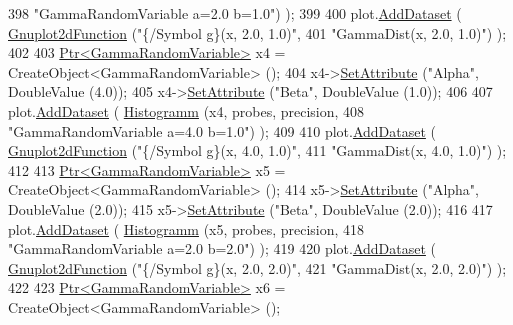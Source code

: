 \begin{DoxyCode}
398                                   \textcolor{stringliteral}{"GammaRandomVariable a=2.0 b=1.0"}) );
399 
400     plot.\hyperlink{classns3_1_1Gnuplot_a306ec724a327cf9ab699700f31fca0a1}{AddDataset} ( \hyperlink{classns3_1_1Gnuplot2dFunction}{Gnuplot2dFunction} (\textcolor{stringliteral}{"\{/Symbol g\}(x, 2.0, 1.0)"},
401                                          \textcolor{stringliteral}{"GammaDist(x, 2.0, 1.0)"}) );
402 
403     \hyperlink{classns3_1_1Ptr}{Ptr<GammaRandomVariable>} x4 = CreateObject<GammaRandomVariable> ();
404     x4->\hyperlink{classns3_1_1ObjectBase_ac60245d3ea4123bbc9b1d391f1f6592f}{SetAttribute} (\textcolor{stringliteral}{"Alpha"}, DoubleValue (4.0));
405     x4->\hyperlink{classns3_1_1ObjectBase_ac60245d3ea4123bbc9b1d391f1f6592f}{SetAttribute} (\textcolor{stringliteral}{"Beta"}, DoubleValue (1.0));
406 
407     plot.\hyperlink{classns3_1_1Gnuplot_a306ec724a327cf9ab699700f31fca0a1}{AddDataset} ( \hyperlink{main-random-variable-stream_8cc_a2cfd3837ab3f2e816cf53486d7a186b5}{Histogramm} (x4, probes, precision,
408                                   \textcolor{stringliteral}{"GammaRandomVariable a=4.0 b=1.0"}) );
409 
410     plot.\hyperlink{classns3_1_1Gnuplot_a306ec724a327cf9ab699700f31fca0a1}{AddDataset} ( \hyperlink{classns3_1_1Gnuplot2dFunction}{Gnuplot2dFunction} (\textcolor{stringliteral}{"\{/Symbol g\}(x, 4.0, 1.0)"},
411                                          \textcolor{stringliteral}{"GammaDist(x, 4.0, 1.0)"}) );
412 
413     \hyperlink{classns3_1_1Ptr}{Ptr<GammaRandomVariable>} x5 = CreateObject<GammaRandomVariable> ();
414     x5->\hyperlink{classns3_1_1ObjectBase_ac60245d3ea4123bbc9b1d391f1f6592f}{SetAttribute} (\textcolor{stringliteral}{"Alpha"}, DoubleValue (2.0));
415     x5->\hyperlink{classns3_1_1ObjectBase_ac60245d3ea4123bbc9b1d391f1f6592f}{SetAttribute} (\textcolor{stringliteral}{"Beta"}, DoubleValue (2.0));
416 
417     plot.\hyperlink{classns3_1_1Gnuplot_a306ec724a327cf9ab699700f31fca0a1}{AddDataset} ( \hyperlink{main-random-variable-stream_8cc_a2cfd3837ab3f2e816cf53486d7a186b5}{Histogramm} (x5, probes, precision,
418                                   \textcolor{stringliteral}{"GammaRandomVariable a=2.0 b=2.0"}) );
419 
420     plot.\hyperlink{classns3_1_1Gnuplot_a306ec724a327cf9ab699700f31fca0a1}{AddDataset} ( \hyperlink{classns3_1_1Gnuplot2dFunction}{Gnuplot2dFunction} (\textcolor{stringliteral}{"\{/Symbol g\}(x, 2.0, 2.0)"},
421                                          \textcolor{stringliteral}{"GammaDist(x, 2.0, 2.0)"}) );
422 
423     \hyperlink{classns3_1_1Ptr}{Ptr<GammaRandomVariable>} x6 = CreateObject<GammaRandomVariable> ();

\end{DoxyCode}
